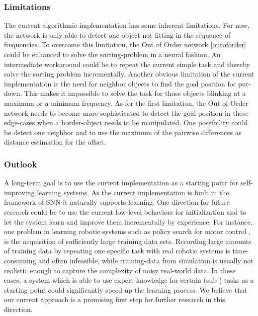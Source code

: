 \subsubsection{Limitations}%
\label{ssubsec:limitations}

The current algorithmic implementation has some inherent limitations. 
For now, the network is only able to detect one object not fitting in the sequence of frequencies. 
To overcome this limitation, the Out of Order network \ref{outoforder} could be enhanced to solve the sorting-problem in a neural fashion. 
An intermediate workaround could be to repeat the current simple task and thereby solve the sorting problem incrementally. 
Another obvious limitation of the current implementation is the need for neighbor objects to find the goal position for put-down. 
This makes it impossible to solve the task for those objects blinking at a maximum or a minimum frequency. 
As for the first limitation, the Out of Order network needs to become more sophisticated to detect the goal position in these edge-cases when a border-object needs to be manipulated. 
One possibility could be detect one neighbor and to use the maximum of the pairwise differences as distance estimation for the offset. 

\subsubsection{Outlook}%
\label{ssubsec:outlook}

A long-term goal is to use the current implementation as a starting point for self-improving learning systems. 
As the current implementation is built in the framework of \acrlong{SNN} it naturally supports learning. 
One direction for future research could be to use the current low-level behaviors for initialization and to let the system learn and improve them incrementally by experience. 
For instance, one problem in learning robotic systems such as policy search for motor control \cite{Levine2015}, is the acquisition of sufficiently large training data sets. 
Recording large amounts of training data by repeating one specific task with real robotic systems is time-consuming and often infeasible, while training-data from simulation is usually not realistic enough to capture the complexity of noisy real-world data. 
In these cases, a system which is able to use expert-knowledge for certain (sub-) tasks as a starting point could significantly speed-up the learning process. 
We believe that our current approach is a promising first step for further research in this direction.


